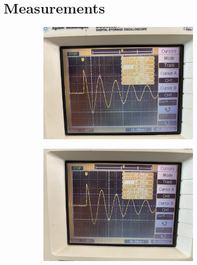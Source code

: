 \documentclass[a4paper,12pt]{article}
\begin{document}
\section{Measurements}
\begin{figure}[h!]
	\begin{subfigure}[b]{100pt}
		\includegraphics[width = 225pt]{figs/fig3.jpg}
	\end{subfigure}
	\hspace{110pt}
\begin{subfigure}[b]{100pt}
		\includegraphics[width = 225pt]{figs/fig4.jpg}
	\end{subfigure}
\end{figure}
\pagebreak
\end{document}

